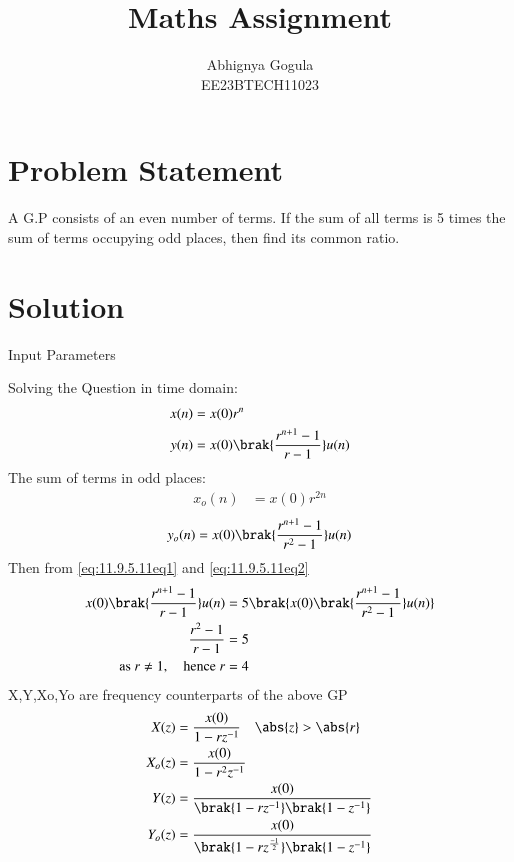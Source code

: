 \documentclass[journal,12pt,twocolumn]{IEEEtran}
\theoremstyle{remark}
\begin{document}

\title{Maths Assignment}
\author{Abhignya Gogula\\
        EE23BTECH11023}
\maketitle
\section*{Problem Statement}
A G.P consists of an even number of terms. If the sum of all terms is 5 times the sum of terms occupying odd places, then find its common ratio.
\section*{Solution}
\begin{table}[h!]
\centering

\caption{Input Parameters}
\label{11.9.5.11tab1}
\end{table}
Solving the Question in time domain:
\begin{align}
x(n) &= x(0)r^{n} \\
y(n) &= x(0)\brak{\frac{r^{n+1}-1}{r-1}}u(n)
\label{eq:11.9.5.11eq1}
\end{align}
The sum of terms in odd places:
\begin{align}
x_o(n) &= x(0)r^{2n}
\end{align}
\begin{equation}
y_o(n)= x(0)\brak{\frac{r^{n+1}-1}{r^2-1}}u(n)
\label{eq:11.9.5.11eq2}
\end{equation}
Then from \eqref{eq:11.9.5.11eq1} and \eqref{eq:11.9.5.11eq2}
\begin{align}
x(0)\brak{\frac{r^{n+1}-1}{r-1}}u(n) &= 5\brak{x(0)\brak{\frac{r^{n+1}-1}{r^2-1}}u(n)}\\
\frac{r^2-1}{r-1} &= 5\\
\text{as } r \neq 1, \quad \text{hence } r &= 4\\
\end{align}
X,Y,Xo,Yo are frequency counterparts of the above GP
\begin{align}
X(z) &= \frac{x(0)}{1-rz^{-1}} \quad \abs{z} > \abs{r}\\ 
X_o(z) &= \frac{x(0)}{1-r^{2}z^{-1}}\\
Y(z) &= \frac{x(0)}{\brak{1-rz^{-1}}\brak{1-z^{-1}}}\\
Y_o(z) &= \frac{x(0)}{\brak{1-rz^{\frac{-1}{2}}}\brak{1-z^{-1}}}
\end{align}
\end{document}
